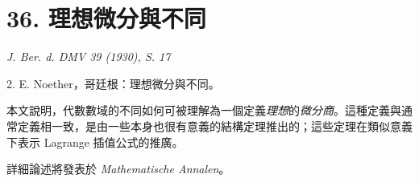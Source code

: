 \documentclass[11pt]{article}
\begin{document}
\section*{36. 理想微分與不同}

\begin{center}
\emph{J. Ber. d. DMV 39 (1930), S. 17}
\end{center}

2. E. Noether，哥廷根：理想微分與不同。

本文說明，代數數域的不同如何可被理解為一個定義\emph{理想}的\emph{微分商}。這種定義與通常定義相一致，是由一些本身也很有意義的結構定理推出的；這些定理在類似意義下表示 Lagrange 插值公式的推廣。

詳細論述將發表於 \emph{Mathematische Annalen}。
\end{document}
